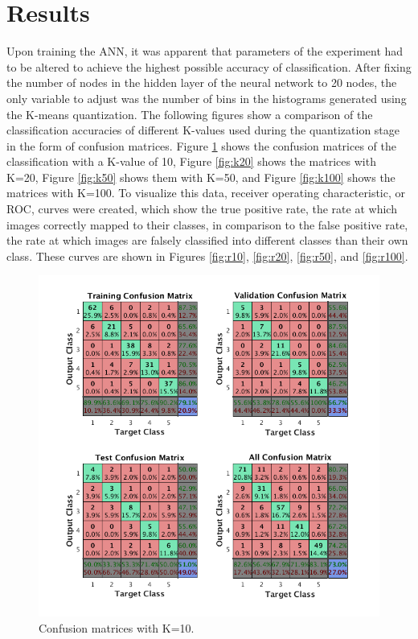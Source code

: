 \documentclass{article}
\begin{document}
\section{Results}
\label{sec:results}
Upon training the ANN, it was apparent that parameters of the experiment had to be altered to achieve the highest possible accuracy of classification. After fixing the number of nodes in the hidden layer of the neural network to 20 nodes, the only variable to adjust was the number of bins in the histograms generated using the K-means quantization. The following figures show a comparison of the classification accuracies of different K-values used during the quantization stage in the form of confusion matrices. Figure \ref{fig:k10} shows the confusion matrices of the classification with a K-value of 10, Figure \ref{fig:k20} shows the matrices with K=20, Figure \ref{fig:k50} shows them with K=50, and Figure \ref{fig:k100} shows the matrices with K=100. To visualize this data, receiver operating characteristic, or ROC, curves were created, which show the true positive rate, the rate at which images correctly mapped to their classes, in comparison to the false positive rate, the rate at which images are falsely classified into different classes than their own class. These curves are shown in Figures \ref{fig:r10}, \ref{fig:r20}, \ref{fig:r50}, and \ref{fig:r100}.
%
\begin{figure}[h]
\centering
\includegraphics[scale=0.5]{Figures/Metrics/conf_k10}
\caption{Confusion matrices with K=10.}
\label{fig:k10}
\end{figure}
\end{document}
